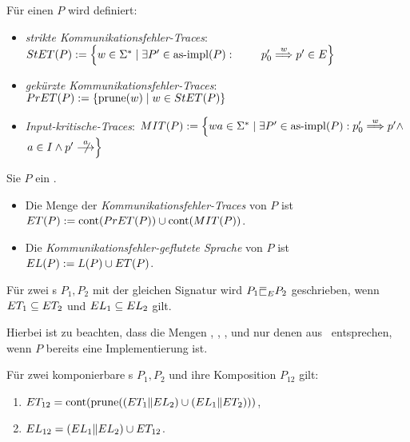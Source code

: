 \begin{Def}
  Für einen \MEIO{} $P$ wird definiert:
  \begin{itemize}
    \item \emph{strikte Kommunikationsfehler-Traces}: $\StET (P) :=
      \left\{w\in\Sigma ^* \mid \exists P' \in\asimp (P) :
      \phantom{\weakmust[w]} \right.$ $\left. p'_0 \weakmust[w] p' \in
      E\right\}$ 
    \item \emph{gekürzte Kommunikationsfehler-Traces}: $PrET (P) :=
      \left\{\mathrm{prune} (w) \mid w\in StET (P)\right\}$
    \item \emph{Input-kritische-Traces}: $\MIT (P) := \left\{wa\in\Sigma ^* \mid
      \exists P' \in\asimp (P) : p'_0
      \weakmust[w] p' \land \right.$\linebreak $\left. a\in I\land p'\nmust[a] \right\}$ 
  \end{itemize}
\end{Def}

\begin{Def}
  \label{KommFehlerSemDef}
  Sie $P$ ein \MEIO{}.
  \begin{itemize}
    \item Die Menge der \emph{Kommunikationsfehler-Traces} von $P$ ist $ET (P)
      := \mathrm{cont} (PrET (P)) \cup\mathrm{cont} (MIT (P))$.
    \item Die \emph{Kommunikationsfehler-geflutete Sprache} von $P$ ist $EL
      (P) := L(P) \cup ET (P)$.
  \end{itemize}
  Für zwei \MEIO{}s $P_1,P_2$ mit der gleichen Signatur wird $P_1\ERel P_2$
  geschrieben, wenn $ET _1\subseteq ET _2$ und $EL _1 \subseteq EL _2$
  gilt.
\end{Def}

Hierbei ist zu beachten, dass die Mengen \StET{}, \PrET{}, \MIT{}, \ET{} und
\EL{} nur denen aus~\cite{Schinko2016BA} entsprechen, wenn $P$ bereits eine
Implementierung ist.

\begin{Satz}
  Für zwei komponierbare \MEIO{}s $P_1,P_2$ und ihre Komposition $P_{12}$ gilt:
  \begin{enumerate}
    \item $ET _{12} = \mathrm{cont} (\mathrm{prune} ((ET _1\|EL _2) \cup (EL _1\|ET
      _2)))$,
    \item $EL _{12} = (EL _1\|EL _2) \cup ET _{12}$.
  \end{enumerate}
\end{Satz}

